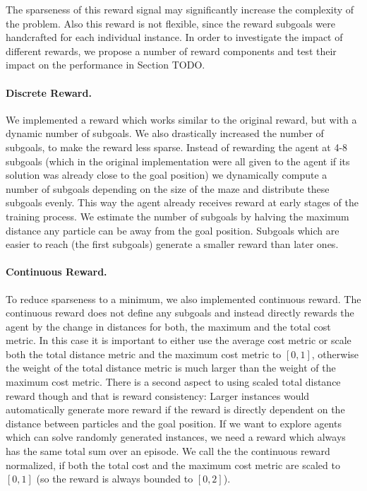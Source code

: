 The sparseness of this reward signal may significantly increase the complexity of the problem. Also this reward is not flexible, since the reward subgoals were handcrafted for each individual instance. In order to investigate the impact of different rewards, we propose a number of reward components and test their impact on the performance in Section TODO. 

\paragraph{Discrete Reward.}
We implemented a reward which works similar to the original reward, but with a dynamic number of subgoals. We also drastically increased the number of subgoals, to make the reward less sparse. Instead of rewarding the agent at 4-8 subgoals (which in the original implementation were all given to the agent if its solution was already close to the goal position) we dynamically compute a number of subgoals depending on the size of the maze and distribute these subgoals evenly. This way the agent already receives reward at early stages of the training process. We estimate the number of subgoals by halving the maximum distance any particle can be away from the goal position. Subgoals which are easier to reach (the first subgoals) generate a smaller reward than later ones.

\paragraph{Continuous Reward.}
To reduce sparseness to a minimum, we also implemented continuous reward. The continuous reward does not define any subgoals and instead directly rewards the agent by the change in distances for both, the maximum and the total cost metric. In this case it is important to either use the average cost metric or scale both the total distance metric and the maximum cost metric to $[0, 1]$, otherwise the weight of the total distance metric is much larger than the weight of the maximum cost metric. There is a second aspect to using scaled total distance reward though and that is reward consistency: Larger instances would automatically generate more reward if the reward is directly dependent on the distance between particles and the goal position. If we want to explore agents which can solve randomly generated instances, we need a reward which always has the same total sum over an episode. We call the the continuous reward normalized, if both the total cost and the maximum cost metric are scaled to $[0, 1]$ (so the reward is always bounded to $[0, 2]$). 

